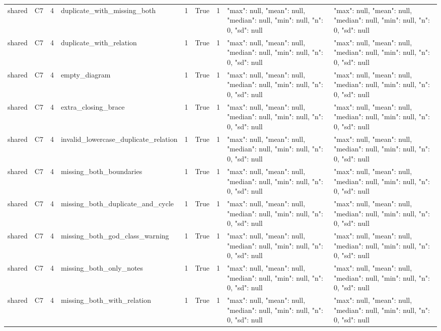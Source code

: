 \begin{tabular}{lllllllll}
shared & C7 & 4 & duplicate\_with\_missing\_both & 1 & True & 1 & {"max": null, "mean": null, "median": null, "min": null, "n": 0, "sd": null} & {"max": null, "mean": null, "median": null, "min": null, "n": 0, "sd": null} \\
shared & C7 & 4 & duplicate\_with\_relation & 1 & True & 1 & {"max": null, "mean": null, "median": null, "min": null, "n": 0, "sd": null} & {"max": null, "mean": null, "median": null, "min": null, "n": 0, "sd": null} \\
shared & C7 & 4 & empty\_diagram & 1 & True & 1 & {"max": null, "mean": null, "median": null, "min": null, "n": 0, "sd": null} & {"max": null, "mean": null, "median": null, "min": null, "n": 0, "sd": null} \\
shared & C7 & 4 & extra\_closing\_brace & 1 & True & 1 & {"max": null, "mean": null, "median": null, "min": null, "n": 0, "sd": null} & {"max": null, "mean": null, "median": null, "min": null, "n": 0, "sd": null} \\
shared & C7 & 4 & invalid\_lowercase\_duplicate\_relation & 1 & True & 1 & {"max": null, "mean": null, "median": null, "min": null, "n": 0, "sd": null} & {"max": null, "mean": null, "median": null, "min": null, "n": 0, "sd": null} \\
shared & C7 & 4 & missing\_both\_boundaries & 1 & True & 1 & {"max": null, "mean": null, "median": null, "min": null, "n": 0, "sd": null} & {"max": null, "mean": null, "median": null, "min": null, "n": 0, "sd": null} \\
shared & C7 & 4 & missing\_both\_duplicate\_and\_cycle & 1 & True & 1 & {"max": null, "mean": null, "median": null, "min": null, "n": 0, "sd": null} & {"max": null, "mean": null, "median": null, "min": null, "n": 0, "sd": null} \\
shared & C7 & 4 & missing\_both\_god\_class\_warning & 1 & True & 1 & {"max": null, "mean": null, "median": null, "min": null, "n": 0, "sd": null} & {"max": null, "mean": null, "median": null, "min": null, "n": 0, "sd": null} \\
shared & C7 & 4 & missing\_both\_only\_notes & 1 & True & 1 & {"max": null, "mean": null, "median": null, "min": null, "n": 0, "sd": null} & {"max": null, "mean": null, "median": null, "min": null, "n": 0, "sd": null} \\
shared & C7 & 4 & missing\_both\_with\_relation & 1 & True & 1 & {"max": null, "mean": null, "median": null, "min": null, "n": 0, "sd": null} & {"max": null, "mean": null, "median": null, "min": null, "n": 0, "sd": null} \\

\end{tabular}
